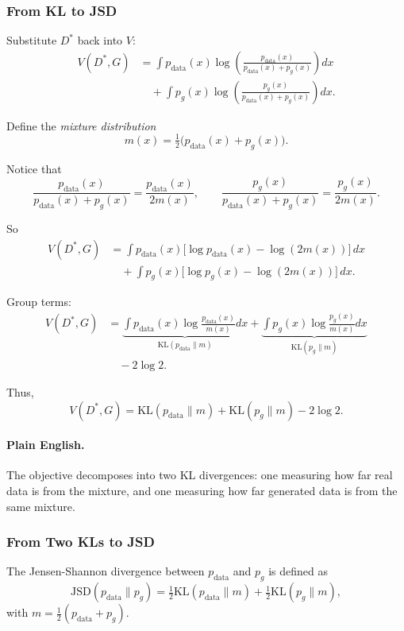 \documentclass[11pt]{article}
\theoremstyle{remark}
\begin{document}
\subsubsection{From KL to JSD}
Substitute $D^*$ back into $V$:
\begin{align}
V(D^*,G)
&=\int p_{\text{data}}(x)\log\!\left(\frac{p_{\text{data}}(x)}{p_{\text{data}}(x)+p_g(x)}\right)dx \\
&\quad + \int p_g(x)\log\!\left(\frac{p_g(x)}{p_{\text{data}}(x)+p_g(x)}\right)dx.
\end{align}

Define the \emph{mixture distribution}
\[
m(x) = \tfrac{1}{2}\big(p_{\text{data}} (x)+p_g(x)\big) .
\]

Notice that
\[
\frac{p_{\text{data}}(x)}{p_{\text{data}}(x)+p_g(x)} = \frac{p_{\text{data}}(x)}{2m(x)},\qquad
\frac{p_g(x)}{p_{\text{data}}(x)+p_g(x)} = \frac{p_g(x)}{2m(x)}.
\]

So
\begin{align}
V(D^*,G)
&= \int p_{\text{data}}(x)\Big[\log p_{\text{data}}(x) - \log(2m(x))\Big]\,dx \\
&\quad + \int p_g(x)\Big[\log p_g(x) - \log(2m(x))\Big]\,dx.
\end{align}

Group terms:
\begin{align}
V(D^*,G)
&= \underbrace{\int p_{\text{data}}(x)\log\frac{p_{\text{data}}(x)}{m(x)}dx}_{\mathrm{KL}(p_{\text{data}}\|m)}
+ \underbrace{\int p_g(x)\log\frac{p_g(x)}{m(x)}dx}_{\mathrm{KL}(p_g\|m)} \\
&\quad - 2\log 2.
\end{align}

Thus,
\begin{equation}
\boxed{V(D^*,G) = \mathrm{KL}(p_{\text{data}}\|m) + \mathrm{KL}(p_g\|m) - 2\log 2.}
\end{equation}

\paragraph{Plain English.}
The objective decomposes into two KL divergences: one measuring how far real data is from the mixture, and one measuring how far generated data is from the same mixture.

\subsubsection{From Two KLs to JSD}
The Jensen-Shannon divergence between $p_{\text{data}}$ and $p_g$ is defined as
\begin{equation}
\mathrm{JSD}(p_{\text{data}}\|p_g) = \tfrac{1}{2}\mathrm{KL}(p_{\text{data}}\|m) + \tfrac{1}{2}\mathrm{KL}(p_g\|m),
\end{equation}
with $m=\tfrac{1}{2}(p_{\text{data}}+p_g)$.
\end{document}
